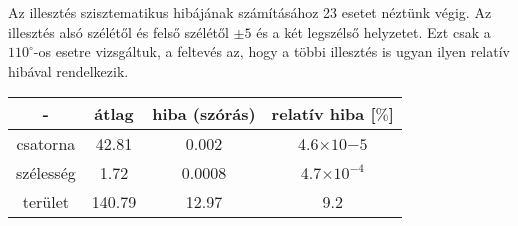 \par Az illesztés szisztematikus hibájának számításához 23 esetet néztünk végig. Az illesztés alsó szélétől és felső szélétől $\pm 5$ és a két legszélső helyzetet. Ezt csak a $110^{\circ}$-os esetre vizsgáltuk, a feltevés az, hogy a többi illesztés is ugyan ilyen relatív hibával rendelkezik.

\begin{center}
\begin{tabular}{|c|c|c|c|}
\hline
- & átlag & hiba (szórás) & relatív hiba [$\%$] \\
\hline
csatorna & 42.81 & 0.002 & 4.6$\times 10{-5}$ \\
\hline
szélesség & 1.72 & 0.0008 & 4.7$\times 10^{-4}$ \\
\hline
terület & 140.79 & 12.97 & 9.2 \\
\hline

\end{tabular}
\end{center}
